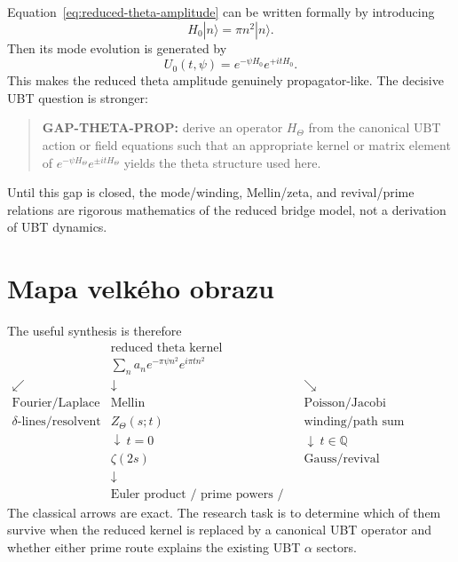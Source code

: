 Equation~\eqref{eq:reduced-theta-amplitude} can be written formally by introducing
\begin{equation}
 H_0|n\rangle=\pi n^2|n\rangle.
\end{equation}
Then its mode evolution is generated by
\begin{equation}
 U_0(t,\psi)=e^{-\psi H_0}e^{+itH_0}.
 \label{eq:formal-complex-propagator}
\end{equation}
This makes the reduced theta amplitude genuinely propagator-like.  The decisive UBT
question is stronger:
\begin{quote}
\textbf{GAP-THETA-PROP:} derive an operator $H_\Theta$ from the canonical UBT action or
field equations such that an appropriate kernel or matrix element of
$e^{-\psi H_\Theta}e^{\pm itH_\Theta}$ yields the theta structure used here.
\end{quote}
Until this gap is closed, the mode/winding, Mellin/zeta, and revival/prime relations are
rigorous mathematics of the reduced bridge model, not a derivation of UBT dynamics.

\section{Mapa velkého obrazu}

The useful synthesis is therefore
\begin{equation}
\boxed{
\begin{array}{ccccc}
 & \text{reduced theta kernel} & & &\\
 & \displaystyle\sum_n a_n e^{-\pi\psi n^2}e^{i\pi t n^2} & & &\\[2mm]
 \swarrow & \downarrow & \searrow & &\\[-1mm]
 \text{Fourier/Laplace} & \text{Mellin} & \text{Poisson/Jacobi} & &\\
 \delta\text{-lines/resolvent} & Z_\Theta(s;t) & \text{winding/path sum} & &\\
 & \downarrow\ t=0 & \downarrow\ t\in\mathbb Q & &\\
 & \zeta(2s) & \text{Gauss/revival arithmetic} & &\\
 & \downarrow & & &\\
 & \text{Euler product / prime powers / zeros} & & &
\end{array}}
\end{equation}
The classical arrows are exact.  The research task is to determine which of them survive
when the reduced kernel is replaced by a canonical UBT operator and whether either prime
route explains the existing UBT $\alpha$ sectors.
